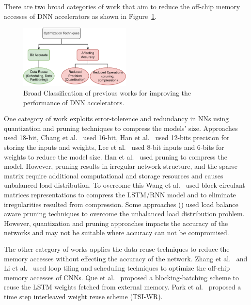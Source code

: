 \documentclass[a4paper,10pt]{article}
\begin{document}
There are two broad categories of work that aim to reduce the off-chip memory accesses of DNN accelerators as shown in Figure~\ref{fig:previousWorkClassification}. 
\begin{figure}[!htb]
	\centering
	\includegraphics[width=0.5\textwidth]{previousWorkClassification}
	\caption{Broad Classification of previous works for improving the performance of DNN accelerators.}
	\label{fig:previousWorkClassification}
\end{figure}
One category of work exploits error-tolerence and redundancy in NNs using quantization and pruning techniques to compress the models' size. Approaches~\cite{ferreira2016fpga,wang2018c} used 18-bit, Chang et al.~\cite{chang2015recurrent} used 16-bit, Han et al.~\cite{han2017ese} used 12-bits precision for storing the inputs and weights, Lee et al.~\cite{lee2016fpga} used 8-bit inputs and 6-bits for weights to reduce the model size. 
Han et al.~\cite{han2017ese} used pruning to compress the model. However, pruning results in irregular network structure, and the sparse matrix require additional computational and storage resources and causes unbalanced load distribution. To overcome this Wang et al.~\cite{wang2018c} used block-circulant matrices representations to compress the LSTM/RNN model and to eliminate irregularities resulted from compression. Some approaches (\cite{park2019balancing,han2017ese,park2018maximizing}) used load balance aware pruning techniques to overcome the unbalanced load distribution problem. However, quantization and pruning approaches impacts the accuracy of the networks and may not be suitable where accuracy can not be compromised. 

The other category of works applies the data-reuse techniques to reduce the memory accesses without effecting the accuracy of the network. Zhang et al.~\cite{zhang2015optimizing} and Li et al.~\cite{Li2018SmartShuttleOO} used loop tiling and scheduling techniques to optimize the off-chip memory accesses of CNNs. Que et al.~\cite{que2019efficient} proposed a blocking-batching scheme to reuse the LSTM weights fetched from external memory. Park et al.~\cite{park2020time} proposed a time step interleaved weight reuse scheme (TSI-WR). 
\end{document}
